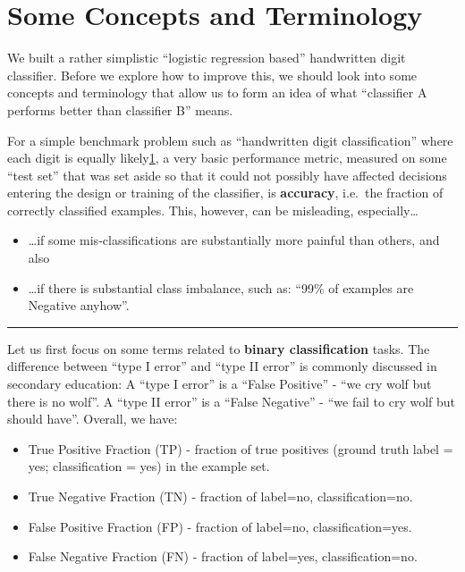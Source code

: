 \documentclass[11pt]{article}
\providecommand{\tightlist}{%
      \setlength{\itemsep}{0pt}\setlength{\parskip}{0pt}}
\begin{document}
    \hypertarget{some-concepts-and-terminology}{%
\section{Some Concepts and
Terminology}\label{some-concepts-and-terminology}}

We built a rather simplistic ``logistic regression based'' handwritten
digit classifier. Before we explore how to improve this, we should look
into some concepts and terminology that allow us to form an idea of what
``classifier A performs better than classifier B'' means.

For a simple benchmark problem such as ``handwritten digit
classification'' where each digit is equally
likely\href{Note\%20however\%20that\%20among\%20actually-handwritten-by-people\%20digits,\%20we\%20likely\%20would\%20see\%20more\%201-s\%20than\%209-s.(See:\%20https://en.wikipedia.org/wiki/Benford\%27s_law).}{1},
a very basic performance metric, measured on some ``test set'' that was
set aside so that it could not possibly have affected decisions entering
the design or training of the classifier, is \textbf{accuracy}, i.e.~the
fraction of correctly classified examples. This, however, can be
misleading, especially\ldots{}

\begin{itemize}
\tightlist
\item
  \ldots if some mis-classifications are substantially more painful than
  others, and also
\item
  \ldots if there is substantial class imbalance, such as: ``99\% of
  examples are Negative anyhow''.
\end{itemize}

\begin{center}\rule{0.5\linewidth}{0.5pt}\end{center}

Let us first focus on some terms related to \textbf{binary
classification} tasks. The difference between ``type I error'' and
``type II error'' is commonly discussed in secondary education: A ``type
I error'' is a ``False Positive'' - ``we cry wolf but there is no
wolf''. A ``type II error'' is a ``False Negative'' - ``we fail to cry
wolf but should have''. Overall, we have:

\begin{itemize}
\tightlist
\item
  True Positive Fraction (TP) - fraction of true positives (ground truth
  label = yes; classification = yes) in the example set.
\item
  True Negative Fraction (TN) - fraction of label=no, classification=no.
\item
  False Positive Fraction (FP) - fraction of label=no,
  classification=yes.
\item
  False Negative Fraction (FN) - fraction of label=yes,
  classification=no.
\end{itemize}
\end{document}
